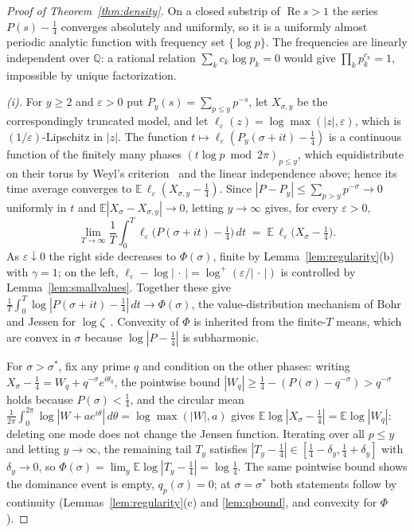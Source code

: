 \documentclass[11pt]{article}
\numberwithin{equation}{section}
\theoremstyle{plain}
\theoremstyle{definition}
\theoremstyle{remark}
\begin{document}
\begin{proof}[Proof of Theorem~\ref{thm:density}]
On a closed substrip of $\operatorname{Re} s > 1$ the series $P(s) - \tfrac14$
converges absolutely and uniformly, so it is a uniformly almost periodic analytic
function with frequency set $\{\log p\}$. The frequencies are linearly independent
over $\mathbb{Q}$: a rational relation $\sum_k c_k \log p_k = 0$ would give
$\prod_k p_k^{c_k} = 1$, impossible by unique factorization.

\emph{(i).} For $y \ge 2$ and $\varepsilon > 0$ put
$P_y(s) = \sum_{p \le y} p^{-s}$, let $X_{\sigma,y}$ be the correspondingly truncated
model, and let $\ell_\varepsilon(z) = \log \max(|z|, \varepsilon)$, which is
$(1/\varepsilon)$-Lipschitz in $|z|$. The function
$t \mapsto \ell_\varepsilon(P_y(\sigma+it) - \tfrac14)$ is a continuous function of
the finitely many phases $(t \log p \bmod 2\pi)_{p \le y}$, which equidistribute on
their torus by Weyl's criterion~\cite{weyl} and the linear independence above; hence
its time
average converges to $\mathbb{E}\,\ell_\varepsilon(X_{\sigma,y} - \tfrac14)$. Since
$|P - P_y| \le \sum_{p > y} p^{-\sigma} \to 0$ uniformly in $t$ and
$\mathbb{E}|X_\sigma - X_{\sigma,y}| \to 0$, letting $y \to \infty$ gives, for every
$\varepsilon > 0$,
\[
\lim_{T\to\infty} \frac1T \int_0^T
\ell_\varepsilon\bigl(P(\sigma+it) - \tfrac14\bigr)\, dt
\;=\; \mathbb{E}\,\ell_\varepsilon\bigl(X_\sigma - \tfrac14\bigr).
\]
As $\varepsilon \downarrow 0$ the right side decreases to $\Phi(\sigma)$, finite by
Lemma~\ref{lem:regularity}(b) with $\gamma = 1$; on the left,
$\ell_\varepsilon - \log|\,\cdot\,| = \log^+(\varepsilon/|\,\cdot\,|)$ is controlled
by Lemma~\ref{lem:smallvalues}. Together these give
$\frac1T \int_0^T \log|P(\sigma+it) - \tfrac14|\, dt \to \Phi(\sigma)$, the
value-distribution mechanism of Bohr and Jessen for $\log\zeta$~\cite{bohrjessen}.
Convexity of $\Phi$ is inherited from the finite-$T$ means, which are convex in
$\sigma$ because $\log|P - \tfrac14|$ is subharmonic.

For $\sigma > \sigma^{*}$, fix any prime $q$ and condition on the other phases:
writing $X_\sigma - \tfrac14 = W_q + q^{-\sigma} e^{i\theta_q}$, the pointwise bound
$|W_q| \ge \tfrac14 - (P(\sigma) - q^{-\sigma}) > q^{-\sigma}$ holds because
$P(\sigma) < \tfrac14$, and the circular mean
$\frac{1}{2\pi}\int_0^{2\pi} \log|W + a e^{i\theta}|\, d\theta = \log\max(|W|, a)$
gives $\mathbb{E} \log|X_\sigma - \tfrac14| = \mathbb{E}\log|W_q|$: deleting one mode
does not change the Jensen function. Iterating over all $p \le y$ and letting
$y \to \infty$, the remaining tail $T_y$ satisfies $|T_y - \tfrac14| \in
[\tfrac14 - \delta_y, \tfrac14 + \delta_y]$ with $\delta_y \to 0$, so
$\Phi(\sigma) = \lim_y \mathbb{E}\log|T_y - \tfrac14| = \log\tfrac14$. The same
pointwise bound shows the dominance event is empty, $q_p(\sigma) = 0$; at
$\sigma = \sigma^{*}$ both statements follow by continuity
(Lemmas~\ref{lem:regularity}(c) and \ref{lem:qbound}, and convexity for $\Phi$).


\end{proof}
\end{document}

